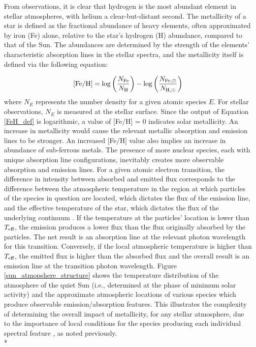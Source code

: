 \documentclass[12pt, a4paper]{report}
\begin{document}
From observations, it is clear that hydrogen is the most abundant element in stellar atmospheres, with helium a clear-but-distant second. The metallicity of a star is defined as the fractional abundance of heavy elements, often approximated by iron (Fe) alone, relative to the star's hydrogen (H) abundance, compared to that of the Sun. The abundances are determined by the strength of the elements' characteristic absorption lines in the stellar spectra, and the metallicity itself is defined via the following equation:

\begin{equation}
\textnormal{[Fe/H]} = \log\left(\frac{N_{\textnormal{Fe}}}{N_{\textnormal{H}}}\right) - \log\left(\frac{N_{\textnormal{Fe},\odot}}{N_{\textnormal{H},\odot}}\right)
\label{FeH_def}
\end{equation}
where $N_{E}$ represents the number density for a given atomic species $E$. For stellar observations, $N_{E}$ is measured at the stellar surface. Since the output of Equation \ref{FeH_def} is logarithmic, a value of [Fe/H] = 0 indicates solar metallicity. An increase in metallicity would cause the relevant metallic absorption and emission lines to be stronger. An increased [Fe/H] value also implies an increase in abundance of sub-ferrous metals. The presence of more nuclear species, each with unique absorption line configurations, inevitably creates more observable absorption and emission lines. For a given atomic electron transition, the difference in intensity between absorbed and emitted flux corresponds to the difference between the atmospheric temperature in the region at which particles of the species in question are located, which dictates the flux of the emission line, and the effective temperature of the star, which dictates the flux of the underlying continuum \citep{1981ApJS...45..635V}. If the temperature at the particles' location is lower than $T_{\textnormal{eff}}$, the emission produces a lower flux than the flux originally absorbed by the particles. The net result is an absorption line at the relevant photon wavelength for this transition. Conversely, if the local atmospheric temperature is higher than $T_{\textnormal{eff}}$, the emitted flux is higher than the absorbed flux and the overall result is an emission line at the transition photon wavelength. Figure \ref{sun_atmopshere_structure} shows the temperature distribution of the atmosphere of the quiet Sun (i.e., determined at the phase of minimum solar activity) and the approximate atmospheric locations of various species which produce observable emission/absorption features. This illustrates the complexity of determining the overall impact of metallicity, for any stellar atmosphere, due to the importance of local conditions for the species producing each individual spectral feature \citep{1981ApJS...45..635V}, as noted previously.\\*
\end{document}
